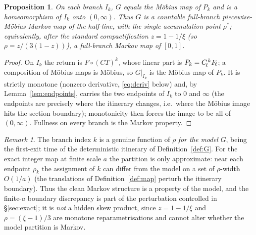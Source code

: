 \documentclass[11pt]{article}
\newtheorem{proposition}{Proposition}\newtheorem{corollary}{Corollary}
\theoremstyle{definition}\newtheorem{definition}{Definition}
\theoremstyle{remark}\newtheorem{remark}{Remark}
\begin{document}
\begin{proposition}\label{prop:markov}
On each branch $I_k$, $G$ equals the M\"obius map of $P_k$ and is a
homeomorphism of $I_k$ onto $(0,\infty)$. Thus $G$ is a countable
full-branch piecewise-M\"obius Markov map of the half-line, with the single
accumulation point $\rho^\ast$; equivalently, after the standard
compactification $z=1-1/\xi$ (so $\rho=z/(3(1-z))$), a full-branch Markov
map of $[0,1]$.
\end{proposition}
\begin{proof}
On $I_k$ the return is $F\circ(CT)^k$, whose linear part is
$P_k=C_{\!\ell}^{\,k}F_{\!\ell}$; a composition of M\"obius maps is
M\"obius, so $G|_{I_k}$ is the M\"obius map of $P_k$. It is strictly
monotone (nonzero derivative, \eqref{eq:deriv} below) and, by
Lemma~\ref{lem:endpoints}, carries the two endpoints of $I_k$ to $0$ and
$\infty$ (the endpoints are precisely where the itinerary changes, i.e.\
where the M\"obius image hits the section boundary); monotonicity then
forces the image to be all of $(0,\infty)$. Fullness on every branch is the
Markov property.
\end{proof}

\begin{remark}\label{rem:model-only}
The branch index $k$ is a genuine function of $\rho$ \emph{for the model
$G$}, being the first-exit time of the deterministic itinerary of
Definition~\ref{def:G}. For the exact integer map at finite scale $a$ the
partition is only approximate: near each endpoint $\rho_k$ the assignment of
$k$ can differ from the model on a set of $\rho$-width $O(1/a)$ (the
translations of Definition~\ref{def:map} perturb the itinerary boundary).
Thus the clean Markov structure is a property of the model, and the
finite-$a$ boundary discrepancy is part of the perturbation controlled in
\S\ref{sec:exact}; it is \emph{not} a hidden skew product, since $z=1-1/\xi$
and $\rho=(\xi-1)/3$ are monotone reparametrisations and cannot alter
whether the model partition is Markov.
\end{remark}
\end{document}
